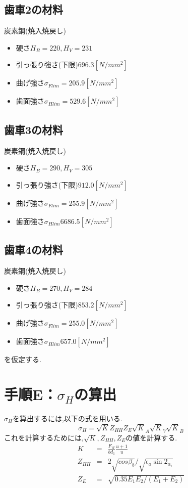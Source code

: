 \subsection{歯車2の材料}
炭素鋼(焼入焼戻し)
\begin{itemize}
\item 硬さ$ H_B = 220,H_V=231$
\item 引っ張り強さ(下限)$696.3[N/mm^2]$
\item 曲げ強さ$\sigma_{Flim}=205.9[N/mm^2]$
\item 歯面強さ$\sigma_{Hlim}=529.6[N/mm^2]$
\end{itemize}
\subsection{歯車3の材料}
炭素鋼(焼入焼戻し)
\begin{itemize}
\item 硬さ$ H_B = 290,H_V=305$
\item 引っ張り強さ(下限)$912.0[N/mm^2]$
\item 曲げ強さ$\sigma_{Flim}=255.9[N/mm^2]$
\item 歯面強さ$\sigma_{Hlim}6686.5[N/mm^2]$
\end{itemize}
\subsection{歯車4の材料}
炭素鋼(焼入焼戻し)
\begin{itemize}
\item 硬さ$ H_B = 270,H_V=284$
\item 引っ張り強さ(下限)$853.2[N/mm^2]$
\item 曲げ強さ$\sigma_{Flim}=255.0[N/mm^2]$
\item 歯面強さ$\sigma_{Hlim}657.0[N/mm^2]$
\end{itemize}
を仮定する.
\section{手順E：$\sigma_H$の算出}
$\sigma_H$を算出するには,以下の式を用いる.
\begin{equation}
\sigma_H=\sqrt K Z_{HH}Z_{E}\sqrt K_A \sqrt K_V \sqrt K_B\nonumber
\end{equation}
これを計算するためには,$\sqrt K, Z_{HH},Z_{E}$の値を計算する.
\begin{eqnarray}
K &=&\frac{F_W}{bd_1}\frac{u+1}{u}\nonumber\\
Z_{HH}&=&2\sqrt{cos{\beta_b}}/\sqrt{\epsilon_a \sin{2_{\alpha_i}}}\nonumber\\
Z_E&=&\sqrt{0.35E_1E_2/(E_1+E_2)}\nonumber
\end{eqnarray}

